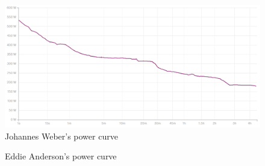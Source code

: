\documentclass[12pt]{article}
\begin{document}
\begin{figure}
    \centering
    \includegraphics[width=1\columnwidth]{Johannes Weber}
    \caption{Johannes Weber's power curve}
\end{figure}
\begin{figure}
    \centering
    
    \caption{Eddie Anderson's power curve}
\end{figure}
\end{document}
